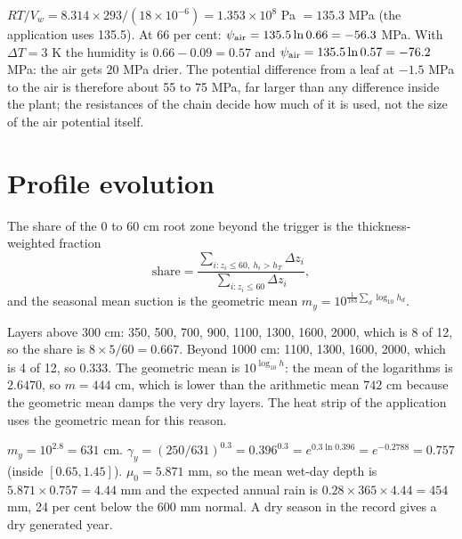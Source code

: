 \sol  $RT/V_w=8.314\times293/(18\times10^{-6})=1.353\times10^{8}$ Pa $=135.3$ MPa (the application uses 135.5). At $66$ per cent: $\psi_{\rm air}=135.5\ln0.66=-56.3$ MPa. With $\Delta T=3$ K the humidity is $0.66-0.09=0.57$ and $\psi_{\rm air}=135.5\ln0.57=-76.2$ MPa: the air gets $20$ MPa drier. The potential difference from a leaf at $-1.5$ MPa to the air is therefore about 55 to 75 MPa, far larger than any difference inside the plant; the resistances of the chain decide how much of it is used, not the size of the air potential itself.


\section{Profile evolution}
The share of the 0 to 60 cm root zone beyond the trigger is the thickness-weighted fraction
\begin{equation}\boxed{\mathrm{share}=\frac{\sum_{i:z_i\le60,\ h_i>h_T}\Delta z_i}{\sum_{i:z_i\le60}\Delta z_i},}\end{equation}
and the seasonal mean suction is the geometric mean $m_y=10^{\frac1{183}\sum_d\log_{10}h_d}$.

\sol  Layers above 300 cm: 350, 500, 700, 900, 1100, 1300, 1600, 2000, which is 8 of 12, so the share is $8\times5/60=0.667$. Beyond 1000 cm: 1100, 1300, 1600, 2000, which is 4 of 12, so $0.333$. The geometric mean is $10^{\overline{\log_{10}h}}$: the mean of the logarithms is $2.6470$, so $m=444$ cm, which is lower than the arithmetic mean $742$ cm because the geometric mean damps the very dry layers. The heat strip of the application uses the geometric mean for this reason.


\sol  $m_y=10^{2.8}=631$ cm. $\gamma_y=(250/631)^{0.3}=0.396^{0.3}=e^{0.3\ln0.396}=e^{-0.2788}=0.757$ (inside $[0.65,1.45]$). $\mu_0=5.871$ mm, so the mean wet-day depth is $5.871\times0.757=4.44$ mm and the expected annual rain is $0.28\times365\times4.44=454$ mm, 24 per cent below the 600 mm normal. A dry season in the record gives a dry generated year.

